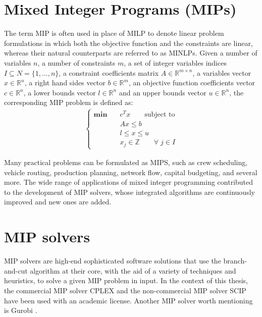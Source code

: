 \documentclass[a4paper,12pt,twoside]{scrbook}
\begin{document}
\section{Mixed Integer Programs (MIPs)} \label{sec:mip}
The term MIP is often used in place of MILP to denote linear problem formulations in which both the objective function and the constraints are linear, whereas their natural counterparts are referred to as MINLPs.
Given a number of variables $n$, a number of constraints $m$, a set of integer variables indices $I \subseteq N = \{1, \dots, n\}$, a constraint coefficients matrix $A \in \mathbb{R}^{m \times n}$, a variables vector $x \in \mathbb{R}^n$, a right hand sides vector $b \in \mathbb{R}^m$, an objective function coefficients vector $c \in \mathbb{R}^n$, a lower bounds vector $l \in \mathbb{R}^n$ and an upper bounds vector $u \in \mathbb{R}^n$, the corresponding MIP problem is defined as:
\begin{align} \label{eq:mip}
	\begin{cases}
	\textbf{min} \quad & c^Tx \qquad \mbox{subject to} \\
				 & Ax \leq b \\
				 & l \leq x \leq u \\
				 & x_j \in \mathbb{Z} \qquad \forall \; j \in I
	\end{cases}
\end{align}

Many practical problems can be formulated as MIPS, such as crew scheduling, vehicle routing, production planning, network flow, capital budgeting, and several more. The wide range of applications of mixed integer programming contributed to the development of MIP solvers, whose integrated algorithms are continuously improved and new ones are added.

\section{MIP solvers} \label{sec:mipsolvers}
MIP solvers are high-end sophisticated software solutions that use the branch-and-cut algorithm at their core, with the aid of a variety of techniques and heuristics, to solve a given MIP problem in input. In the context of this thesis, the commercial MIP solver CPLEX \cite{cplex} and the non-commercial MIP solver SCIP \cite{scip} have been used with an academic license. Another MIP solver worth mentioning is Gurobi \cite{gurobi}. \par 
\end{document}
